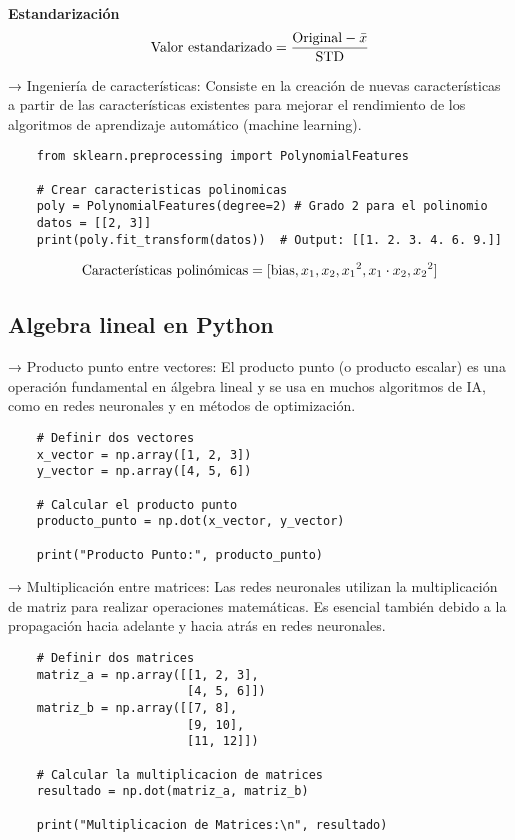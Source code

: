 \documentclass{templateNote}
\begin{document}
\begin{center}
    \textbf{Estandarización}
    \begin{equation*}
        \textnormal{Valor estandarizado} = \frac{\textnormal{Original} - \bar{x}}{\textnormal{STD}} 
    \end{equation*}
\end{center}
 
 → Ingeniería de características: Consiste en la creación de nuevas características a partir de las características existentes para mejorar el rendimiento de los algoritmos de aprendizaje automático (machine learning).
\begin{lstlisting}
    from sklearn.preprocessing import PolynomialFeatures

    # Crear caracteristicas polinomicas
    poly = PolynomialFeatures(degree=2) # Grado 2 para el polinomio
    datos = [[2, 3]]
    print(poly.fit_transform(datos))  # Output: [[1. 2. 3. 4. 6. 9.]]
\end{lstlisting}
\begin{align*}
    \textnormal{Características polinómicas} = [\textnormal{bias}, x_1, x_2, {x_1}^2, x_1 \cdot x_2, {x_2}^2]
\end{align*}

\subsection{Algebra lineal en Python}

→ Producto punto entre vectores: El producto punto (o producto escalar) es una operación fundamental en álgebra lineal y se usa en muchos algoritmos de IA, como en redes neuronales y en métodos de optimización.
\begin{lstlisting}
    # Definir dos vectores
    x_vector = np.array([1, 2, 3])
    y_vector = np.array([4, 5, 6])
    
    # Calcular el producto punto
    producto_punto = np.dot(x_vector, y_vector)
    
    print("Producto Punto:", producto_punto)
\end{lstlisting}

→ Multiplicación entre matrices: Las redes neuronales utilizan la multiplicación de matriz para realizar operaciones matemáticas. Es esencial también debido a la propagación hacia adelante y hacia atrás en redes neuronales.
\begin{lstlisting}
    # Definir dos matrices
    matriz_a = np.array([[1, 2, 3],
                         [4, 5, 6]])
    matriz_b = np.array([[7, 8],
                         [9, 10],
                         [11, 12]])
    
    # Calcular la multiplicacion de matrices
    resultado = np.dot(matriz_a, matriz_b)
    
    print("Multiplicacion de Matrices:\n", resultado)
\end{lstlisting}
\end{document}
